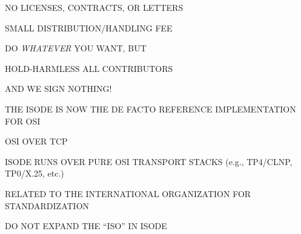 \begin{bwslide}

\begin{nrtc}
\item	NO LICENSES, CONTRACTS, OR LETTERS

\item	SMALL DISTRIBUTION/HANDLING FEE

\item	DO \emph{WHATEVER} YOU WANT, BUT

\item	HOLD-HARMLESS ALL CONTRIBUTORS

\item	AND WE SIGN NOTHING!
\end{nrtc}
\end{bwslide}


\begin{bwslide}

\begin{nrtc}
\item	THE ISODE IS NOW THE DE FACTO REFERENCE IMPLEMENTATION FOR OSI
\end{nrtc}
\end{bwslide}


\begin{bwslide}

\begin{nrtc}
\item	OSI OVER TCP
    \begin{nrtc}
    \item	ISODE RUNS OVER PURE OSI TRANSPORT STACKS
		(e.g., TP4/CLNP, TP0/X.25, etc.)
    \end{nrtc}

\item	RELATED TO THE INTERNATIONAL ORGANIZATION FOR STANDARDIZATION
    \begin{nrtc}
    \item	DO NOT EXPAND THE ``ISO'' IN ISODE
    \end{nrtc}
\end{nrtc}
\end{bwslide}


